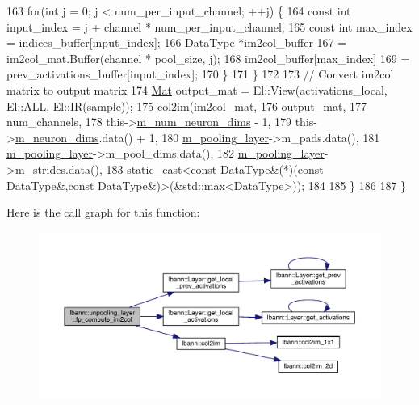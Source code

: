 \begin{DoxyCode}
163         \textcolor{keywordflow}{for}(\textcolor{keywordtype}{int} j = 0; j < num\_per\_input\_channel; ++j) \{
164           \textcolor{keyword}{const} \textcolor{keywordtype}{int} input\_index = j + channel * num\_per\_input\_channel;
165           \textcolor{keyword}{const} \textcolor{keywordtype}{int} max\_index = indices\_buffer[input\_index];
166           DataType *im2col\_buffer
167             = im2col\_mat.Buffer(channel * pool\_size, j);
168           im2col\_buffer[max\_index]
169             = prev\_activations\_buffer[input\_index];
170         \}
171       \}
172 
173       \textcolor{comment}{// Convert im2col matrix to output matrix}
174       \hyperlink{base_8hpp_a68f11fdc31b62516cb310831bbe54d73}{Mat} output\_mat = El::View(activations\_local, El::ALL, El::IR(sample));
175       \hyperlink{namespacelbann_a0e1225f72580ffb5166181392b68b651}{col2im}(im2col\_mat,
176              output\_mat,
177              num\_channels,
178              this->\hyperlink{classlbann_1_1Layer_adfd6178d21498c9095cd947ae1eb2d6a}{m\_num\_neuron\_dims} - 1,
179              this->\hyperlink{classlbann_1_1Layer_abb34bb8031f57a483e2e327a5f229f48}{m\_neuron\_dims}.data() + 1,
180              \hyperlink{classlbann_1_1unpooling__layer_ab15a8b0680685f80c7d995e617e97a9a}{m\_pooling\_layer}->m\_pads.data(),
181              \hyperlink{classlbann_1_1unpooling__layer_ab15a8b0680685f80c7d995e617e97a9a}{m\_pooling\_layer}->m\_pool\_dims.data(),
182              \hyperlink{classlbann_1_1unpooling__layer_ab15a8b0680685f80c7d995e617e97a9a}{m\_pooling\_layer}->m\_strides.data(),
183              \textcolor{keyword}{static\_cast<}\textcolor{keyword}{const }DataType&(*)(\textcolor{keyword}{const }DataType&,\textcolor{keyword}{const }DataType&)\textcolor{keyword}{>}(&std::max<DataType>));
184 
185     \}
186 
187   \}
\end{DoxyCode}
Here is the call graph for this function\+:\nopagebreak
\begin{figure}[H]
\begin{center}
\leavevmode
\includegraphics[width=350pt]{classlbann_1_1unpooling__layer_ab4a0b7cc4711426434983c41cd7dbc63_cgraph}
\end{center}
\end{figure}
